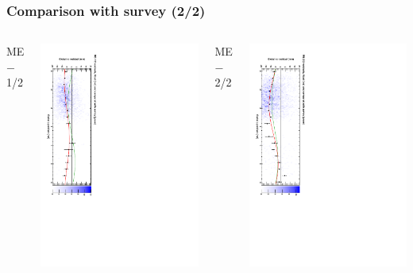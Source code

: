 \documentclass[compress]{beamer}
\begin{document}
\begin{frame}
\frametitle{Comparison with survey (2/2)}

\begin{columns}

ME$-$1/2

\includegraphics[height=\linewidth, angle=90]{datacsc_survey_mem12.pdf}

ME$-$2/2

\includegraphics[height=\linewidth, angle=90]{datacsc_survey_mem22.pdf}


\end{columns}
\end{frame}
\end{document}
